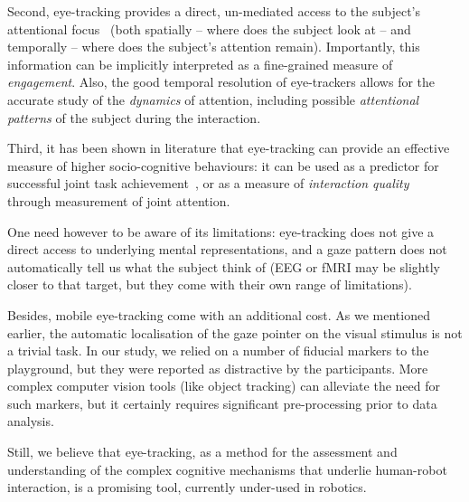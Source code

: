 \documentclass{sig-alternate}
\begin{document}
Second, eye-tracking provides a direct, un-mediated access to the subject's
attentional focus~\cite{sharma2014withmeness} (both spatially -- where does the
subject look at -- and temporally -- where does the subject's attention remain).
Importantly, this information can be implicitly interpreted as a fine-grained measure of
\emph{engagement}.  Also, the good temporal resolution of eye-trackers allows
for the accurate study of the \emph{dynamics} of attention, including possible
\emph{attentional patterns} of the subject during the interaction.

Third, it has been shown in literature that eye-tracking can provide an
effective measure of higher socio-cognitive behaviours: it can be used as a
predictor for successful joint task achievement~\cite{sharma2013understanding},
or as a measure of \emph{interaction quality}~\cite{jermann2012effects} through
measurement of joint attention.

One need however to be aware of its limitations: eye-tracking does not give a direct
access to underlying mental representations, and a gaze pattern does not
automatically tell us what the subject think of (EEG or fMRI may be slightly
closer to that target, but they come with their own range of limitations).

Besides, mobile eye-tracking come with an additional cost. As we mentioned
earlier, the automatic localisation of the gaze pointer on the visual stimulus
is not a trivial task. In our study, we relied on a number of fiducial markers
to the playground, but they were reported as distractive by the participants.
More complex computer vision tools (like object tracking) can alleviate the need
for such markers, but it certainly requires significant pre-processing prior to
data analysis.

Still, we believe that eye-tracking, as a method for the assessment and
understanding of the complex cognitive mechanisms that underlie human-robot
interaction, is a promising tool, currently under-used in robotics.



%




\balancecolumns
\end{document}
